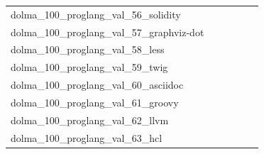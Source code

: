 \documentclass[dvipsnames]{article}
\begin{document}
\begin{appendix}
{\begin{longtable}{m{6cm}m{1.7cm}m{1.7cm}m{1.7cm}m{1.7cm}m{1.7cm}}
	dolma\_100\_proglang\_val\_56\_solidity  & \colorbox[HTML]{9dd687}{\makebox[\mywidth][c]{4.09}} & \colorbox[HTML]{f9fcc6}{\makebox[\mywidth][c]{4.41}} & \colorbox[HTML]{ffffe5}{\makebox[\mywidth][c]{5.28}} & \colorbox[HTML]{77c578}{\makebox[\mywidth][c]{4.05}} & \colorbox[HTML]{9fd688}{\makebox[\mywidth][c]{4.10}}\\
	dolma\_100\_proglang\_val\_57\_graphviz-dot  & \colorbox[HTML]{77c578}{\makebox[\mywidth][c]{2.17}} & \colorbox[HTML]{f3fab6}{\makebox[\mywidth][c]{2.48}} & \colorbox[HTML]{ffffe5}{\makebox[\mywidth][c]{3.54}} & \colorbox[HTML]{cae99c}{\makebox[\mywidth][c]{2.32}} & \colorbox[HTML]{bee496}{\makebox[\mywidth][c]{2.29}}\\
	dolma\_100\_proglang\_val\_58\_less  & \colorbox[HTML]{e3f4aa}{\makebox[\mywidth][c]{2.24}} & \colorbox[HTML]{fbfdd0}{\makebox[\mywidth][c]{2.26}} & \colorbox[HTML]{ffffe5}{\makebox[\mywidth][c]{2.33}} & \colorbox[HTML]{87cc7f}{\makebox[\mywidth][c]{2.22}} & \colorbox[HTML]{77c578}{\makebox[\mywidth][c]{2.22}}\\
	dolma\_100\_proglang\_val\_59\_twig  & \colorbox[HTML]{e1f3a9}{\makebox[\mywidth][c]{1.81}} & \colorbox[HTML]{e8f6ae}{\makebox[\mywidth][c]{1.81}} & \colorbox[HTML]{ffffe5}{\makebox[\mywidth][c]{1.91}} & \colorbox[HTML]{9fd688}{\makebox[\mywidth][c]{1.80}} & \colorbox[HTML]{77c578}{\makebox[\mywidth][c]{1.79}}\\
	dolma\_100\_proglang\_val\_60\_asciidoc  & \colorbox[HTML]{77c578}{\makebox[\mywidth][c]{5.33}} & \colorbox[HTML]{d1ec9f}{\makebox[\mywidth][c]{5.50}} & \colorbox[HTML]{ffffe5}{\makebox[\mywidth][c]{6.84}} & \colorbox[HTML]{b2df90}{\makebox[\mywidth][c]{5.43}} & \colorbox[HTML]{81c97c}{\makebox[\mywidth][c]{5.34}}\\
	dolma\_100\_proglang\_val\_61\_groovy  & \colorbox[HTML]{7fc97b}{\makebox[\mywidth][c]{2.12}} & \colorbox[HTML]{d8efa2}{\makebox[\mywidth][c]{2.15}} & \colorbox[HTML]{ffffe5}{\makebox[\mywidth][c]{2.41}} & \colorbox[HTML]{b4e091}{\makebox[\mywidth][c]{2.13}} & \colorbox[HTML]{77c578}{\makebox[\mywidth][c]{2.11}}\\
	dolma\_100\_proglang\_val\_62\_llvm  & \colorbox[HTML]{95d284}{\makebox[\mywidth][c]{2.26}} & \colorbox[HTML]{e6f5ad}{\makebox[\mywidth][c]{2.40}} & \colorbox[HTML]{ffffe5}{\makebox[\mywidth][c]{3.25}} & \colorbox[HTML]{bbe395}{\makebox[\mywidth][c]{2.31}} & \colorbox[HTML]{77c578}{\makebox[\mywidth][c]{2.23}}\\
	dolma\_100\_proglang\_val\_63\_hcl  & \colorbox[HTML]{bee496}{\makebox[\mywidth][c]{2.52}} & \colorbox[HTML]{e5f5ac}{\makebox[\mywidth][c]{2.56}} & \colorbox[HTML]{ffffe5}{\makebox[\mywidth][c]{2.96}} & \colorbox[HTML]{c3e698}{\makebox[\mywidth][c]{2.52}} & \colorbox[HTML]{77c578}{\makebox[\mywidth][c]{2.48}}\\

\end{longtable}}
\end{appendix}
\end{document}
